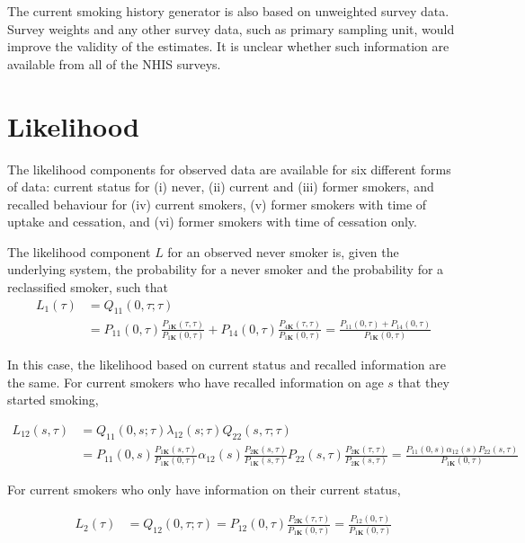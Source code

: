\documentclass[11pt,a4paper]{article}
\newcommand{\K}{\ensuremath{\bm{K}}}
\begin{document}
The current smoking history generator is also based on unweighted
survey data. Survey weights and any other survey data, such as primary
sampling unit, would improve the validity of the estimates. It is
unclear whether such information are available from all of the NHIS surveys.


\section{Likelihood}

The likelihood components for observed data are available for six
different forms of data: current status for (i) never, (ii) current
and (iii) former smokers, and recalled behaviour for (iv) current
smokers, (v) former smokers with time of uptake and cessation, and
(vi) former smokers with time of cessation only.  

The likelihood component $L$ for an observed never smoker is, given the underlying system, the 
probability for a never smoker and the probability for a reclassified smoker, such that
\begin{align*}
L_1(\tau) & = Q_{11}(0,\tau;\tau) \\
& = P_{11}(0,\tau)\frac{P_{1\K}(\tau,\tau)}{P_{1\K}(0,\tau)} +P_{14}(0,\tau)\frac{P_{4\K}(\tau,\tau)}{P_{1\K}(0,\tau)} 
= \frac{P_{11}(0,\tau)+P_{14}(0,\tau)}{P_{1\K}(0,\tau)}  
\end{align*}

In this case, the likelihood based on current status and recalled information are the same.
For current smokers who have recalled information on age $s$ that they started smoking,

\begin{align*}
L_{12}(s,\tau) & = Q_{11}(0,s;\tau)\lambda_{12}(s;\tau)Q_{22}(s,\tau;\tau) \\
& = P_{11}(0,s)\frac{P_{1\K}(s,\tau)}{P_{1\K}(0,\tau)} 
\alpha_{12}(s) \frac{P_{2\K}(s,\tau)}{P_{1\K}(s,\tau)}
P_{22}(s,\tau)\frac{P_{2\K}(\tau,\tau)}{P_{2\K}(s,\tau)}
 = \frac{P_{11}(0,s)\alpha_{12}(s)P_{22}(s,\tau)}{P_{1\K}(0,\tau)}
\end{align*}

For current smokers who only have information on their current status, 

\begin{align*}
L_2(\tau) & = Q_{12}(0,\tau;\tau)  = P_{12}(0,\tau)\frac{P_{2\K}(\tau,\tau)}{P_{1\K}(0,\tau)} 
= \frac{P_{12}(0,\tau)}{P_{1\K}(0,\tau)}  
\end{align*}
\end{document}
